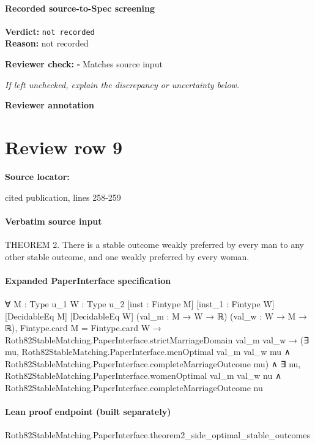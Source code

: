 \documentclass[10pt]{article}
\newcommand{\reviewerbox}{%
  \par\noindent\fbox{\parbox{0.96\linewidth}{\rule{0pt}{0.38in}}}\par
}
\newcommand{\reviewmatch}[1]{%
  \par\noindent\textbf{Reviewer check:} $\square$\; #1\par
  \noindent\emph{If left unchecked, explain the discrepancy or uncertainty below.}\par
}
\begin{document}
\paragraph{Recorded source-to-Spec screening}
\textbf{Verdict:} \texttt{not recorded}
\\
\textbf{Reason:} not recorded
\reviewmatch{Matches source input}
\noindent\textbf{Reviewer annotation}\par
\reviewerbox
\clearpage
\hypertarget{source-claim-e0f372cfa20685ca}{}
\section*{Review row 9}
\textbf{Source locator:} {\footnotesize\raggedright cited publication, lines 258-\allowbreak{}259\par}
\paragraph{Verbatim source input}
\begin{ReviewVerbatim}
THEOREM 2. There is a stable outcome weakly preferred by every man to any other
stable outcome, and one weakly preferred by every woman.
\end{ReviewVerbatim}


\paragraph{Expanded PaperInterface specification}
\begin{ReviewVerbatim}
∀ {M : Type u_1} {W : Type u_2} [inst : Fintype M] [inst_1 : Fintype W] [DecidableEq M] [DecidableEq W]
  (val_m : M → W → ℝ) (val_w : W → M → ℝ),
  Fintype.card M = Fintype.card W →
    Roth82StableMatching.PaperInterface.strictMarriageDomain val_m val_w →
      (∃ mu,
          Roth82StableMatching.PaperInterface.menOptimal val_m val_w mu ∧
            Roth82StableMatching.PaperInterface.completeMarriageOutcome mu) ∧
        ∃ nu,
          Roth82StableMatching.PaperInterface.womenOptimal val_m val_w nu ∧
            Roth82StableMatching.PaperInterface.completeMarriageOutcome nu
\end{ReviewVerbatim}

\paragraph{Lean proof endpoint (built separately)}\begin{ReviewVerbatim}
Roth82StableMatching.PaperInterface.theorem2_side_optimal_stable_outcomes
\end{ReviewVerbatim}
\end{document}
